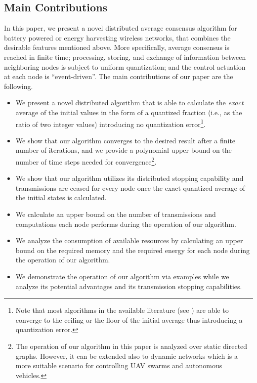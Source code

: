\documentclass[twocolumn]{autart}    %
\begin{document}
\subsection{Main Contributions}\label{Contributions}


In this paper, we present a novel distributed average consensus algorithm for battery powered or energy harvesting wireless networks, that combines the desirable features mentioned above. 
More specifically, average consensus is reached in finite time; processing, storing, and exchange of information between neighboring nodes is subject to uniform quantization; and the control actuation at each node is ``event-driven''. 
The main contributions of our paper are the following. 
\begin{itemize}
\item We present a novel distributed algorithm that is able to calculate the \textit{exact} average of the initial values in the form of a quantized fraction (i.e., as the ratio of two integer values) introducing no quantization error\footnote{Note that most algorithms in the available literature (see \cite{2007:Basar, 2009:Nedic, 2011:Cai_Ishii}) are able to converge to the ceiling or the floor of the initial average thus introducing a quantization error.}. 
\item We show that our algorithm converges to the desired result after a finite number of iterations, and we provide a polynomial upper bound on the number of time steps needed for convergence\footnote{The operation of our algorithm in this paper is analyzed over static directed graphs.
However, it can be extended also to dynamic networks which is a more suitable scenario for controlling UAV swarms and autonomous vehicles.}. %
\item We show that our algorithm utilizes its distributed stopping capability and transmissions are ceased for every node once the exact quantized average of the initial states is calculated. 
\item We calculate an upper bound on the number of transmissions and computations each node performs during the operation of our algorithm. 
\item We analyze the consumption of available resources by calculating an upper bound on the required memory and the required energy for each node during the operation of our algorithm. 
\item We demonstrate the operation of our algorithm via examples while we analyze its potential advantages and its transmission stopping capabilities. 
\end{itemize}
\end{document}
